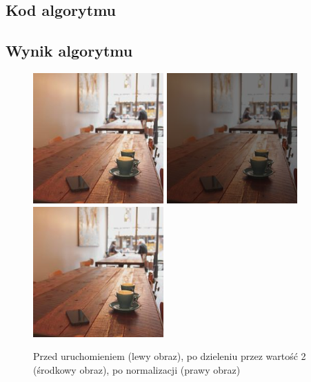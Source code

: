 \documentclass[a4paper,12pt]{book}
\begin{document}
\subsection*{Kod algorytmu}

\subsection*{Wynik algorytmu}
\begin{figure}[H]
	\caption{Przed uruchomieniem (lewy obraz), po dzieleniu przez wartość 2 (środkowy obraz), po normalizacji (prawy obraz)}
	\includegraphics[width=5cm, height=5cm]{coffee-unmodified.jpg}
	\includegraphics[width=5cm, height=5cm]{3-5/divide-color-const-coffee-2.png}
	\includegraphics[width=5cm, height=5cm]{3-5/divide-color-const-coffee-2-norm.png}
\end{figure}
\end{document}
